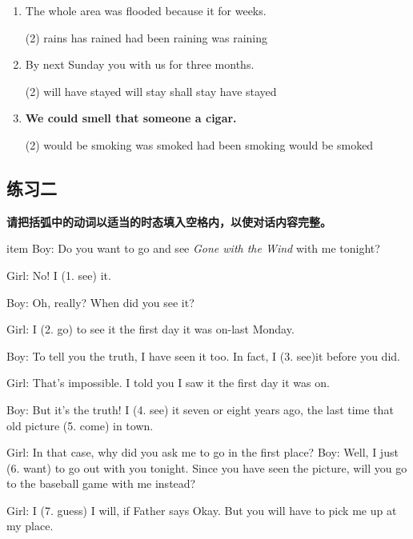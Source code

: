 \begin{enumerate}
\item The whole area was flooded because it \ttu for weeks.
  \begin{tasks}(2)
    \task rains
    \task has rained
    \task had been raining
    \task was raining
  \end{tasks}

\item By next Sunday you \ttu with us for three months.
  \begin{tasks}(2)
    \task will have stayed
    \task will stay
    \task shall stay
    \task have stayed
  \end{tasks}


\item \textbf{We could smell that someone \ttu a cigar.}
  \begin{tasks}(2)
    \task would be smoking
    \task was smoked
    \task had been smoking
    \task would be smoked
  \end{tasks}

\end{enumerate}

\subsection{练习二}

\textbf{请把括弧中的动词以适当的时态填入空格内，以使对话内容完整。}

item Boy: Do you want to go and see \textit{Gone with the Wind} with me tonight?

Girl: No! I \ttu (1. see) it.

Boy: Oh, really? When did you see it?

Girl: I \ttu (2. go) to see it the first day it was on-last Monday.

Boy: To tell you the truth, I have seen it too. In fact, I \ttu (3. see)it before you did.

Girl: That's impossible. I told you I saw it the first day it was on.

Boy: But it's the truth! I \ttu (4. see) it seven or eight years ago, the
last time that old picture \ttu (5. come) in town.


Girl: In that case, why did you ask me to go in the first place? Boy: Well,
I just \ttu (6. want) to go out with you tonight. Since you have seen the
picture, will you go to the baseball game with me instead?

Girl: I \ttu (7. guess) I will, if Father says Okay. But you will have to
pick me up at my place.

